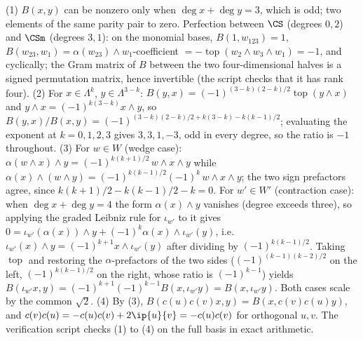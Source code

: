 (1) $B(x,y)$ can be nonzero only when $\deg x + \deg y = 3$, which is odd; two elements of the same parity pair to zero. Perfection between $\CS$ (degrees $0,2$) and $\CSm$ (degrees $3,1$): on the monomial bases, $B(1, w_{123}) = 1$, $B(w_{23}, w_1) = \alpha(w_{23})\wedge w_1$-coefficient $= -\operatorname{top}(w_2\wedge w_3\wedge w_1) = -1$, and cyclically; the Gram matrix of $B$ between the two four-dimensional halves is a signed permutation matrix, hence invertible (the script checks that it has rank four).
(2) For $x \in \Lambda^k$, $y \in \Lambda^{3-k}$: $B(y,x) = (-1)^{(3-k)(2-k)/2}\operatorname{top}(y \wedge x)$ and $y\wedge x = (-1)^{k(3-k)}x\wedge y$, so $B(y,x)/B(x,y) = (-1)^{(3-k)(2-k)/2 + k(3-k) - k(k-1)/2}$; evaluating the exponent at $k = 0,1,2,3$ gives $3, 3, 1, -3$, odd in every degree, so the ratio is $-1$ throughout.
(3) For $w \in W$ (wedge case): $\alpha(w \wedge x)\wedge y = (-1)^{k(k+1)/2}\,w\wedge x\wedge y$ while $\alpha(x)\wedge(w\wedge y) = (-1)^{k(k-1)/2}(-1)^k\,w\wedge x\wedge y$; the two sign prefactors agree, since $k(k+1)/2 - k(k-1)/2 - k = 0$. For $w' \in W'$ (contraction case): when $\deg x + \deg y = 4$ the form $\alpha(x)\wedge y$ vanishes (degree exceeds three), so applying the graded Leibniz rule for $\iota_{w'}$ to it gives $0 = \iota_{w'}(\alpha(x))\wedge y + (-1)^k \alpha(x)\wedge \iota_{w'}(y)$, i.e.\ $\iota_{w'}(x)\wedge y = (-1)^{k+1} x \wedge \iota_{w'}(y)$ after dividing by $(-1)^{k(k-1)/2}$. Taking $\operatorname{top}$ and restoring the $\alpha$-prefactors of the two sides ($(-1)^{(k-1)(k-2)/2}$ on the left, $(-1)^{k(k-1)/2}$ on the right, whose ratio is $(-1)^{k-1}$) yields $B(\iota_{w'}x, y) = (-1)^{k+1}(-1)^{k-1} B(x, \iota_{w'}y) = B(x, \iota_{w'}y)$. Both cases scale by the common $\sqrt2$.
(4) By (3), $B(c(u)c(v)x, y) = B(x, c(v)c(u)y)$, and $c(v)c(u) = -c(u)c(v) + 2\ip{u}{v} = -c(u)c(v)$ for orthogonal $u, v$. The verification script checks (1) to (4) on the full basis in exact arithmetic.
